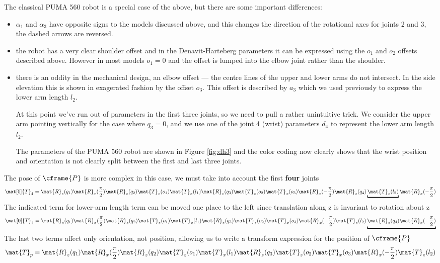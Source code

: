\documentclass[11pt]{article}
\numberwithin{equation}{section}
\begin{document}
The classical PUMA 560 robot is a special case of the above, but there are some important differences:
\begin{itemize}
\item $\alpha_1$ and $\alpha_3$ have opposite signs to the models discussed above, and this changes the direction of the
rotational axes for joints 2 and 3, the dashed arrows are reversed.
\item the robot has a very clear shoulder offset and in the Denavit-Harteberg parameters it can be expressed using the
$o_1$ and $o_2$ offsets described above.   However in most models $o_1=0$ and the offset is lumped into the elbow joint rather than the shoulder.
\item there is an oddity in the mechanical design, an elbow offset --- the centre lines of the upper and lower arms do not intersect.
In the side elevation this is shown in exagerated fashion by the offset $o_3$.  This offset is described by $a_3$ which we used previously to express the lower arm length $l_2$.

At this point we've run out of parameters in the first three joints, so we need to pull a rather unintuitive trick.
We consider the upper arm pointing vertically for the case where $q_3=0$, and 
 we use one of the joint 4 (wrist) parameters $d_4$ to represent the lower arm length $l_2$.
 
 The parameters of the PUMA 560 robot are shown in Figure \ref{fig:dh3} and the color coding now clearly shows that the wrist position and orientation is not clearly split between the first and last
three joints.
 \end{itemize}

The pose of $\cframe{P}$ is more complex in this case, we must take into account the first \textbf{four} joints
\[
\mat[0]{T}_4 = \mat{R}_z(q_1) \mat{R}_x(\frac{\pi}{2}) \mat{R}_z(q_2)  \mat{T}_z(o_1) \mat{T}_x(l_1) \mat{R}_z(q_3) \mat{T}_z(o_2) \mat{T}_x(o_3) \mat{R}_x(-\frac{\pi}{2})  \mat{R}_z(q_4)  \underbracket{\mat{T}_z(l_2)} \mat{R}_x(-\frac{\pi}{2}) 
\]
The indicated term for lower-arm length term can be moved one place to the left since translation along z is invariant to rotation about z
\[
\mat[0]{T}_4 = \mat{R}_z(q_1) \mat{R}_x(\frac{\pi}{2}) \mat{R}_z(q_2)  \mat{T}_z(o_1) \mat{T}_x(l_1) \mat{R}_z(q_3) \mat{T}_z(o_2) \mat{T}_x(o_3) \mat{R}_x(-\frac{\pi}{2})   \mat{T}_z(l_2)  \underbracket{\mat{R}_z(q_4) \mat{R}_x(-\frac{\pi}{2})}
\]
The last two terms affect only orientation, not position, allowing us to write a transform expression for the position of $\cframe{P}$
\[
\mat{T}_p = \mat{R}_z(q_1) \mat{R}_x(\frac{\pi}{2}) \mat{R}_z(q_2)  \mat{T}_z(o_1) \mat{T}_x(l_1) \mat{R}_z(q_3) \mat{T}_z(o_2) \mat{T}_x(o_3) \mat{R}_x(-\frac{\pi}{2})   \mat{T}_z(l_2)
\]
\end{document}
